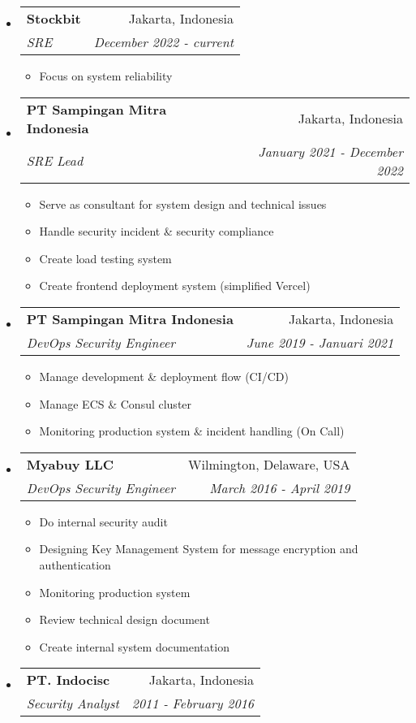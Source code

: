 \documentclass[letterpaper,11pt]{article}
\makeatletter
\newcommand{\resitem}[1]{\item #1 \vspace{-2pt}}
\newcommand{\ressubheading}[4]{
\begin{tabular*}{6.5in}{l@{\cftdotfill{\cftsecdotsep}\extracolsep{\fill}}r}
		\textbf{#1} & #2 \\
		\textit{#3} & \textit{#4} \\
\end{tabular*}\vspace{-6pt}}
\makeatother
\begin{document}
\begin{itemize}

\item

    \ressubheading{Stockbit}{Jakarta, Indonesia}{SRE}{December 2022 - current}
	\begin{itemize}
		\resitem{Focus on system reliability}
	\end{itemize}

\item

    \ressubheading{PT Sampingan Mitra Indonesia}{Jakarta, Indonesia}{SRE Lead}{January 2021 - December 2022}
	\begin{itemize}
		\resitem{Serve as consultant for system design and technical issues}
		\resitem{Handle security incident \& security compliance}
		\resitem{Create load testing system}
		\resitem{Create frontend deployment system (simplified Vercel)}
	\end{itemize}

\item

    \ressubheading{PT Sampingan Mitra Indonesia}{Jakarta, Indonesia}{DevOps Security Engineer}{June 2019 - Januari 2021}
	\begin{itemize}

  		\resitem{Manage development \& deployment flow (CI/CD)}
		\resitem{Manage ECS \& Consul cluster}
		\resitem{Monitoring production system \& incident handling (On Call)}

	\end{itemize}

\item

    \ressubheading{Myabuy LLC}{Wilmington, Delaware, USA}{DevOps Security Engineer}{March 2016 - April 2019}
	\begin{itemize}

  		\resitem{Do internal security audit}
		\resitem{Designing Key Management System for message encryption and authentication}
		\resitem{Monitoring production system}
		\resitem{Review technical design document}
		\resitem{Create internal system documentation}

	\end{itemize}

\item

	\ressubheading{PT. Indocisc}{Jakarta, Indonesia}{Security Analyst}{2011 - February 2016}

	\begin{itemize}


\end{itemize}
\end{itemize}
\end{document}
